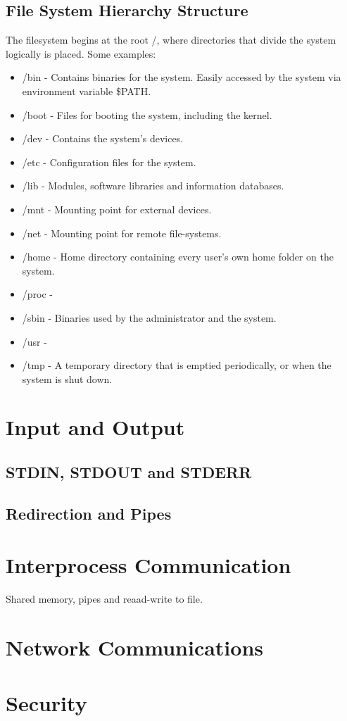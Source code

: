 \documentclass[12pt]{article}
\begin{document}
\subsection{File System Hierarchy Structure}
  The filesystem begins at the root /, where directories that divide the system logically is placed. Some examples:
  \begin{itemize}
    \item /bin - Contains binaries for the system. Easily accessed by the system via environment variable \$PATH.
    \item /boot - Files for booting the system, including the kernel.
    \item /dev - Contains the system's devices.
    \item /etc - Configuration files for the system.
    \item /lib - Modules, software libraries and information databases.
    \item /mnt - Mounting point for external devices.
    \item /net - Mounting point for remote file-systems.
    \item /home - Home directory containing every user's own home folder on the system. 
    \item /proc - 
    \item /sbin - Binaries used by the administrator and the system.
    \item /usr -
    \item /tmp - A temporary directory that is emptied periodically, or when the system is shut down.
  \end{itemize}
 
\section{Input and Output} %
\subsection{STDIN, STDOUT and STDERR}
\subsection{Redirection and Pipes}

\section{Interprocess Communication} %
Shared memory, pipes and reaad-write to file.

\section{Network Communications} %

\section{Security} %
\end{document}
